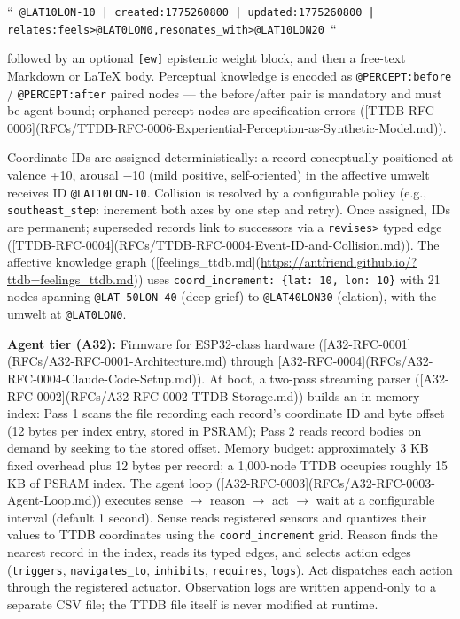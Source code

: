 \documentclass[11pt]{article}
\begin{document}
``\texttt{ @LAT10LON-10 | created:1775260800 | updated:1775260800 | relates:feels>@LAT0LON0,resonates\_with>@LAT10LON20 }``

followed by an optional \texttt{[ew]} epistemic weight block, and then a free-text Markdown or LaTeX body. Perceptual knowledge is encoded as \texttt{@PERCEPT:before} / \texttt{@PERCEPT:after} paired nodes --- the before/after pair is mandatory and must be agent-bound; orphaned percept nodes are specification errors ([TTDB-RFC-0006](RFCs/TTDB-RFC-0006-Experiential-Perception-as-Synthetic-Model.md)).

Coordinate IDs are assigned deterministically: a record conceptually positioned at valence +10, arousal $-$10 (mild positive, self-oriented) in the affective umwelt receives ID \texttt{@LAT10LON-10}. Collision is resolved by a configurable policy (e.g., \texttt{southeast\_step}: increment both axes by one step and retry). Once assigned, IDs are permanent; superseded records link to successors via a \texttt{revises>} typed edge ([TTDB-RFC-0004](RFCs/TTDB-RFC-0004-Event-ID-and-Collision.md)). The affective knowledge graph ([feelings\_ttdb.md](\url{https://antfriend.github.io/?ttdb=feelings_ttdb.md})) uses \texttt{coord\_increment: \{lat: 10, lon: 10\}} with 21 nodes spanning \texttt{@LAT-50LON-40} (deep grief) to \texttt{@LAT40LON30} (elation), with the umwelt at \texttt{@LAT0LON0}.

\textbf{Agent tier (A32):} Firmware for ESP32-class hardware ([A32-RFC-0001](RFCs/A32-RFC-0001-Architecture.md) through [A32-RFC-0004](RFCs/A32-RFC-0004-Claude-Code-Setup.md)). At boot, a two-pass streaming parser ([A32-RFC-0002](RFCs/A32-RFC-0002-TTDB-Storage.md)) builds an in-memory index: Pass 1 scans the file recording each record's coordinate ID and byte offset (12 bytes per index entry, stored in PSRAM); Pass 2 reads record bodies on demand by seeking to the stored offset. Memory budget: approximately 3 KB fixed overhead plus 12 bytes per record; a 1,000-node TTDB occupies roughly 15 KB of PSRAM index. The agent loop ([A32-RFC-0003](RFCs/A32-RFC-0003-Agent-Loop.md)) executes sense $\to$ reason $\to$ act $\to$ wait at a configurable interval (default 1 second). Sense reads registered sensors and quantizes their values to TTDB coordinates using the \texttt{coord\_increment} grid. Reason finds the nearest record in the index, reads its typed edges, and selects action edges (\texttt{triggers}, \texttt{navigates\_to}, \texttt{inhibits}, \texttt{requires}, \texttt{logs}). Act dispatches each action through the registered actuator. Observation logs are written append-only to a separate CSV file; the TTDB file itself is never modified at runtime.
\end{document}
